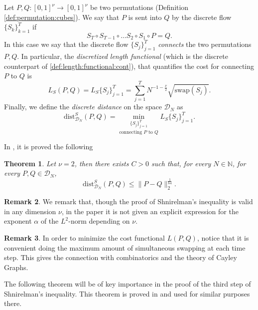 \documentclass[12 pt]{article}
\theoremstyle{definition} \newtheorem{definition}{Definition}[section]
\theoremstyle{definition} \newtheorem{remark}[definition]{Remark}
\theoremstyle{plain} \newtheorem{lemma}[definition]{Lemma}
\theoremstyle{plain} \newtheorem{proposition}[definition]{Proposition}
\theoremstyle{plain} \newtheorem{theorem}[definition]{Theorem}
\theoremstyle{plain} \newtheorem{corollary}[definition]{Corollary}
\theoremstyle{definition} \newtheorem{example}[definition]{Example}
\theoremstyle{definition} \newtheorem{assumption}[definition]{Assumption}
\theoremstyle{definition} \newtheorem{conjecture}[definition]{Conjecture}
\newcommand{\1}{\mathbbm 1}
\numberwithin{equation}{section}
\begin{document}
Let $P,Q:[0,1]^\nu\rightarrow [0,1]^\nu$ be two permutations (Definition \ref{def:permutation:cubes}).
  We say that $P$ is sent into $Q$ by the discrete flow $\lbrace S_k\rbrace_{k=1}^T$ if
\begin{equation*}
    S_T\circ S_{T-1}\circ \dots S_2 \circ S_1\circ P=Q.
\end{equation*}
In this case we say that the discrete flow $\lbrace S_j\rbrace_{j=1}^T$ \emph{connects} the two permutations $P,Q$. 
In particular, the \emph{discretized length functional} (which is the discrete counterpart of \eqref{def:length:functional:cont}), that quantifies the cost for connecting $P$ to $Q$ is
\begin{equation}\label{eq:discr:length}
    L_S(P,Q)=L_S\lbrace{S_j}\rbrace_{j=1}^T=\sum_{j=1}^{T} N^{-1-\frac{\nu}{2}}\sqrt{\text{swap}(S_j)}.
\end{equation}
Finally, we define the \emph{discrete distance} on the space $\mathcal{D}_N$ as
\begin{equation}
    \text{dist}^S_{\mathcal{D}_N}(P,Q)=\underset{ \text{connecting } P\text{ to }Q}{\min_{\lbrace S_j\rbrace_{j=1}^{T} }} L_S\lbrace S_j\rbrace_{j=1}^T.
\end{equation}

In \cite{Shnirelman}, it is proved the following
\begin{theorem}\label{thm:shn:discr}
    Let $\nu=2$, then there exists $C>0$ such that, for every $N\in \mathbb{N}$, for every $P,Q\in\mathcal{D}_N$,
    \begin{equation*}
         \text{dist}^S_{\mathcal{D}_N}(P,Q)\leq \|P-Q\|_2^{\frac{1}{64}}. 
    \end{equation*}
\end{theorem}

\begin{remark}
    We remark that, though the proof of Shnirelman's inequality is valid in any dimension $\nu$, in the paper \cite{Shnirelman} it is not given an explicit expression for the exponent $\alpha$ of the $L^2$-norm depending on $\nu$. 
\end{remark}
\begin{remark}
    In order to minimize the cost functional $L(P,Q)$, notice that it is convenient doing the maximum amount of simultaneous swapping at each time step. This gives the connection with combinatorics and the theory of Cayley Graphs.
\end{remark}

The following theorem will be of key importance in the proof of the third step of Shnirelman's inequality. This theorem is proved in \cite{Shnirelman} and used for similar purposes there.
 
\end{document}
